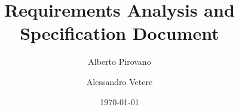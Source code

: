 \documentclass{article}      %
\title{Requirements Analysis and Specification Document}    %
\author{Alberto Pirovano \and Alessandro Vetere}      %
\date{\today}	%
\newcommand{\myTaxiService}[0]{\mbox{\emph{myTaxiService}}}
\newcommand{\sectionBaseDir}[1]{./section_#1}
\newcommand{\sectionTexPath}[1]{\sectionBaseDir{#1}/section_#1.tex}
\newcommand{\inputSection}[1]{\newpage}}
\begin{document}
\maketitle
\newpage %
\tableofcontents             %
\inputSection{1}
\inputSection{2}
\inputSection{3}
\end{document}
